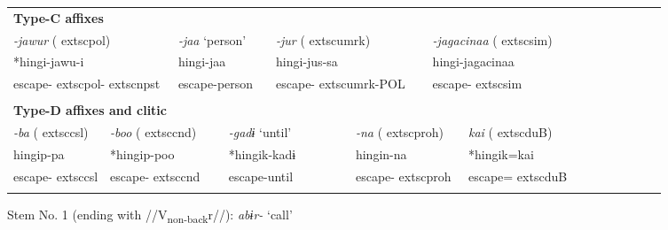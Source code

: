 \begin{tabularx}{\textwidth}{XXXXXXXXXXXXXXXXXXXXXXX}
\multicolumn{23}{X}{{\bfseries Type-C affixes}}\\
\multicolumn{4}{X}{{ \textit{{}-jawur} (	extsc{pol})}} & \multicolumn{3}{X}{{ \textit{{}-jaa} ‘person’}} & \multicolumn{4}{X}{{ \textit{{}-jur} (	extsc{umrk})}} & \multicolumn{5}{X}{{ \textit{{}-jagacinaa} (	extsc{sim})}} & \multicolumn{7}{X}{}\\
\multicolumn{4}{X}{{ *hingi-jawu-i}} & \multicolumn{3}{X}{{ hingi-jaa}} & \multicolumn{4}{X}{{ hingi-jus-sa}} & \multicolumn{5}{X}{{ hingi-jagacinaa}} & \multicolumn{7}{X}{}\\
\multicolumn{4}{X}{escape-	extsc{pol}-	extsc{npst}} & \multicolumn{3}{X}{escape-person} & \multicolumn{4}{X}{escape-	extsc{umrk}-POL} & \multicolumn{5}{X}{escape-	extsc{sim}} & \multicolumn{7}{X}{}\\
\multicolumn{23}{X}{}\\
\multicolumn{23}{X}{{\bfseries Type-D affixes and clitic}}\\
\multicolumn{2}{X}{{ \textit{{}-ba} (	extsc{csl})}} & \multicolumn{3}{X}{{ \textit{{}-boo} (	extsc{cnd})}} & \multicolumn{4}{X}{{ \textit{{}-gadɨ} ‘until’}} & \multicolumn{4}{X}{{ \textit{{}-na} (	extsc{proh})}} & \multicolumn{4}{X}{{ \textit{kai} (	extsc{du}B)}} & \multicolumn{6}{X}{}\\
\multicolumn{2}{X}{{ hingip-pa}} & \multicolumn{3}{X}{{ *hingip-poo}} & \multicolumn{4}{X}{{ *hingik-kadɨ}} & \multicolumn{4}{X}{{ hingin-na}} & \multicolumn{4}{X}{{ *hingik=kai}} & \multicolumn{6}{X}{}\\
\multicolumn{2}{X}{escape-	extsc{csl}} & \multicolumn{3}{X}{escape-	extsc{cnd}} & \multicolumn{4}{X}{escape-until} & \multicolumn{4}{X}{escape-	extsc{proh}} & \multicolumn{4}{X}{escape=	extsc{du}B} & \multicolumn{6}{X}{}\\
\lspbottomrule
\end{tabularx}

Stem No. 1 (ending with //V\textsubscript{non-back}r//): \textit{abɨr-} ‘call’

\tablefirsthead{}

